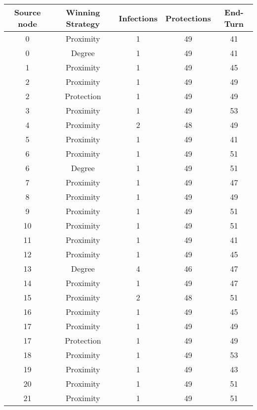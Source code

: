 \documentclass[results.tex]{subfiles}
\begin{document}
\begin{center}
  \begin{tabular}{| c || c | c | c | c |}
    \hline
    {\bfseries Source node} & {\bfseries Winning Strategy} & {\bfseries Infections} & {\bfseries Protections} & {\bfseries End-Turn} \\  %
    \hline\hline
    0 & Proximity & 1 & 49 & 41 \\ 
    \hline
    0 & Degree & 1 & 49 & 41 \\ 
    \hline
    1 & Proximity & 1 & 49 & 45 \\ 
    \hline
    2 & Proximity & 1 & 49 & 49 \\ 
    \hline
    2 & Protection & 1 & 49 & 49 \\ 
    \hline
    3 & Proximity & 1 & 49 & 53 \\ 
    \hline
    4 & Proximity & 2 & 48 & 49 \\ 
    \hline
    5 & Proximity & 1 & 49 & 41 \\ 
    \hline
    6 & Proximity & 1 & 49 & 51 \\ 
    \hline
    6 & Degree & 1 & 49 & 51 \\ 
    \hline
    7 & Proximity & 1 & 49 & 47 \\ 
    \hline
    8 & Proximity & 1 & 49 & 49 \\ 
    \hline
    9 & Proximity & 1 & 49 & 51 \\ 
    \hline
    10 & Proximity & 1 & 49 & 51 \\ 
    \hline
    11 & Proximity & 1 & 49 & 41 \\ 
    \hline
    12 & Proximity & 1 & 49 & 45 \\ 
    \hline
    13 & Degree & 4 & 46 & 47 \\ 
    \hline
    14 & Proximity & 1 & 49 & 47 \\ 
    \hline
    15 & Proximity & 2 & 48 & 51 \\ 
    \hline
    16 & Proximity & 1 & 49 & 45 \\ 
    \hline
    17 & Proximity & 1 & 49 & 49 \\ 
    \hline
    17 & Protection & 1 & 49 & 49 \\ 
    \hline
    18 & Proximity & 1 & 49 & 53 \\ 
    \hline
    19 & Proximity & 1 & 49 & 43 \\ 
    \hline
    20 & Proximity & 1 & 49 & 51 \\ 
    \hline
    21 & Proximity & 1 & 49 & 51 \\ 

\end{tabular}
\end{center}
\end{document}
